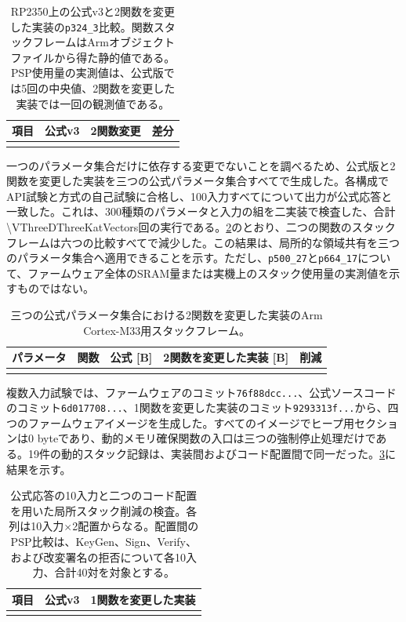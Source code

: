 \documentclass[a4paper,10pt]{ltjsarticle}
\theoremstyle{definition}
\theoremstyle{remark}
\begin{document}
\begin{table}[H]
  \centering
  \caption{RP2350上の公式v3と2関数を変更した実装の\texttt{p324\_3}比較。関数スタックフレームはArmオブジェクトファイルから得た静的値である。PSP使用量の実測値は、公式版では5回の中央値、2関数を変更した実装では一回の観測値である。}
  \label{tab:v3-two-function-target}
  \small
  \begin{tabular}{@{}lrrr@{}}
    \toprule
    項目 & 公式v3 & 2関数変更 & 差分 \\
    \midrule
    \\
    \bottomrule
  \end{tabular}
\end{table}

一つのパラメータ集合だけに依存する変更でないことを調べるため、公式版と2関数を変更した実装を三つの公式パラメータ集合すべてで生成した。各構成でAPI試験と方式の自己試験に合格し、100入力すべてについて出力が公式応答と一致した。これは、300種類のパラメータと入力の組を二実装で検査した、合計\num{\VThreeDThreeKatVectors}回の実行である。\cref{tab:v3-all-parameter-frames}のとおり、二つの関数のスタックフレームは六つの比較すべてで減少した。この結果は、局所的な領域共有を三つのパラメータ集合へ適用できることを示す。ただし、\texttt{p500\_27}と\texttt{p664\_17}について、ファームウェア全体のSRAM量または実機上のスタック使用量の実測値を示すものではない。

\begin{table}[H]
  \centering
  \caption{三つの公式パラメータ集合における2関数を変更した実装のArm Cortex-M33用スタックフレーム。}
  \label{tab:v3-all-parameter-frames}
  \scriptsize
  \begin{tabular}{@{}llrrr@{}}
    \toprule
    パラメータ & 関数 & 公式 [B] & 2関数を変更した実装 [B] & 削減 \\
    \midrule
    \\
    \bottomrule
  \end{tabular}
\end{table}

複数入力試験では、ファームウェアのコミット\texttt{76f88dcc...}、公式ソースコードのコミット\texttt{6d017708...}、1関数を変更した実装のコミット\texttt{9293313f...}から、四つのファームウェアイメージを生成した。すべてのイメージでヒープ用セクションは0 byteであり、動的メモリ確保関数の入口は三つの強制停止処理だけである。19件の動的スタック記録は、実装間およびコード配置間で同一だった。\cref{tab:v3-multi}に結果を示す。

\begin{table}[H]
  \centering
  \caption{公式応答の10入力と二つのコード配置を用いた局所スタック削減の検査。各列は10入力$\times$2配置からなる。配置間のPSP比較は、KeyGen、Sign、Verify、および改変署名の拒否について各10入力、合計40対を対象とする。}
  \label{tab:v3-multi}
  \small
  \begin{tabular}{@{}lrr@{}}
    \toprule
    項目 & 公式v3 & 1関数を変更した実装 \\
    \midrule
    \\
    \bottomrule
  \end{tabular}
\end{table}
\end{document}
